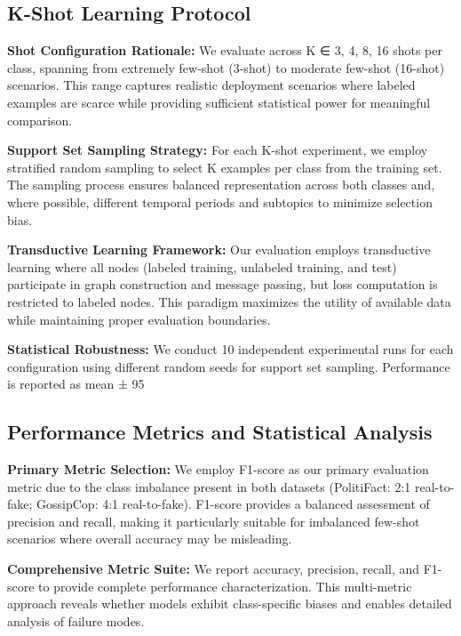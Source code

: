 \subsection{K-Shot Learning Protocol}

\textbf{Shot Configuration Rationale:} We evaluate across K ∈ {3, 4, 8, 16} shots per class, spanning from extremely few-shot (3-shot) to moderate few-shot (16-shot) scenarios. This range captures realistic deployment scenarios where labeled examples are scarce while providing sufficient statistical power for meaningful comparison.

\textbf{Support Set Sampling Strategy:} For each K-shot experiment, we employ stratified random sampling to select K examples per class from the training set. The sampling process ensures balanced representation across both classes and, where possible, different temporal periods and subtopics to minimize selection bias.

\textbf{Transductive Learning Framework:} Our evaluation employs transductive learning where all nodes (labeled training, unlabeled training, and test) participate in graph construction and message passing, but loss computation is restricted to labeled nodes. This paradigm maximizes the utility of available data while maintaining proper evaluation boundaries.

\textbf{Statistical Robustness:} We conduct 10 independent experimental runs for each configuration using different random seeds for support set sampling. Performance is reported as mean ± 95%

\subsection{Performance Metrics and Statistical Analysis}

\textbf{Primary Metric Selection:} We employ F1-score as our primary evaluation metric due to the class imbalance present in both datasets (PolitiFact: 2:1 real-to-fake; GossipCop: 4:1 real-to-fake). F1-score provides a balanced assessment of precision and recall, making it particularly suitable for imbalanced few-shot scenarios where overall accuracy may be misleading.

\textbf{Comprehensive Metric Suite:} We report accuracy, precision, recall, and F1-score to provide complete performance characterization. This multi-metric approach reveals whether models exhibit class-specific biases and enables detailed analysis of failure modes.

